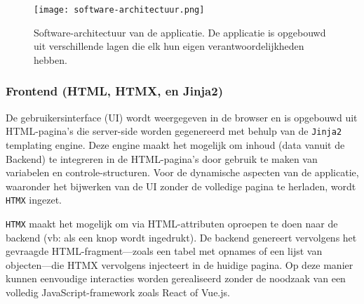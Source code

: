 \begin{figure}[H]
  \centering
  \texttt{[image: software-architectuur.png]}
  \caption[]{\label{fig:software-architectuur} Software-architectuur van de applicatie. De applicatie is opgebouwd uit verschillende lagen die elk hun eigen verantwoordelijkheden hebben. }
\end{figure}

\subsubsection{Frontend (HTML, HTMX, en Jinja2)}

De gebruikersinterface (UI) wordt weergegeven in de browser en is opgebouwd uit HTML-pagina's die server-side worden gegenereerd met behulp van de \texttt{Jinja2} templating engine.
Deze engine maakt het mogelijk om inhoud (data vanuit de Backend) te integreren in de HTML-pagina's door gebruik te maken van variabelen en controle-structuren.
Voor de dynamische aspecten van de applicatie, waaronder het bijwerken van de UI zonder de volledige pagina te herladen, wordt \texttt{HTMX} ingezet.

\texttt{HTMX} maakt het mogelijk om via HTML-attributen oproepen te doen naar de backend (vb: als een knop wordt ingedrukt).
De backend genereert vervolgens het gevraagde HTML-fragment---zoals een tabel met opnames of een lijst van objecten---die HTMX vervolgens injecteert in de huidige pagina.
Op deze manier kunnen eenvoudige interacties worden gerealiseerd zonder de noodzaak van een volledig JavaScript-framework zoals React of Vue.js.

